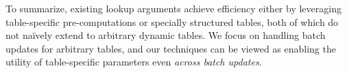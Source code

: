 To summarize, existing lookup arguments achieve efficiency either by leveraging table-specific pre-computations or specially structured tables, both of which do not na\"ively extend to arbitrary dynamic tables. We focus on handling batch updates for arbitrary tables, and our techniques can be viewed as enabling the utility of table-specific parameters even \textit{across batch updates}.    

%
%






